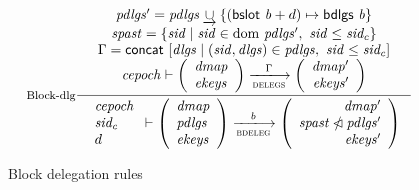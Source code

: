\documentclass[11pt,a4paper]{article}
\DeclareMathOperator{\dom}{dom}
\newcommand{\restrictdom}{\lhd}
\newcommand{\subtractdom}{\mathbin{\slashed{\restrictdom}}}
\newcommand{\unionoverride}{\mathbin{\underrightarrow\cup}}
\newcommand{\var}[1]{\mathit{#1}}
\newcommand{\fun}[1]{\mathsf{#1}}
\newcommand{\trans}[2]{\xlongrightarrow[\textsc{#1}]{#2}}
\newcommand{\bslot}[1]{\fun{bslot}~\var{#1}}
\newcommand{\bdlgs}[1]{\fun{bdlgs}~\var{#1}}
\begin{document}
\begin{figure}
  \begin{equation}
    \label{eq:rule:block-delegation}
    \inference[Block-dlg]
    {
      \var{pdlgs'} = \var{pdlgs} \unionoverride \{(\bslot{b} + d) \mapsto \bdlgs{b} \}\\
      \var{spast} = \{ \var{sid} \mid \var{sid} \in \var \dom ~ \var{pdlgs'}
                                    ,~ \var{sid} \leq \var{sid_c}\}\\
      \Gamma = \fun{concat}~ [ \var{dlgs} \mid (\var{sid}, \var{dlgs}) \in \var{pdlgs}
                                          ,~ \var{sid} \leq \var{sid_c}]\\
      \var{cepoch} \vdash
      {
        \left(
          \begin{array}{l}
            \var{dmap}\\
            \var{ekeys}
          \end{array}
        \right)
      }
      \trans{delegs}{\Gamma}
      {
        \left(
          \begin{array}{r}
            \var{dmap'}\\
            \var{ekeys'}
          \end{array}
        \right)
      }
    }
    {
      \begin{array}{l}
        \var{cepoch}\\
        \var{sid_c}\\
        d
      \end{array}
      \vdash
      {
        \left(
          \begin{array}{l}
            \var{dmap}\\
            \var{pdlgs}\\
            \var{ekeys}
          \end{array}
        \right)
      }
      \trans{bdeleg}{b}
      {
        \left(
          \begin{array}{r}
            \var{dmap'}\\
            \var{\var{spast} \subtractdom pdlgs'}\\
            \var{ekeys'}
          \end{array}
        \right)
      }
    }
  \end{equation}
  \caption{Block delegation rules}
  \label{fig:block-delegation-rules}
\end{figure}
\end{document}
